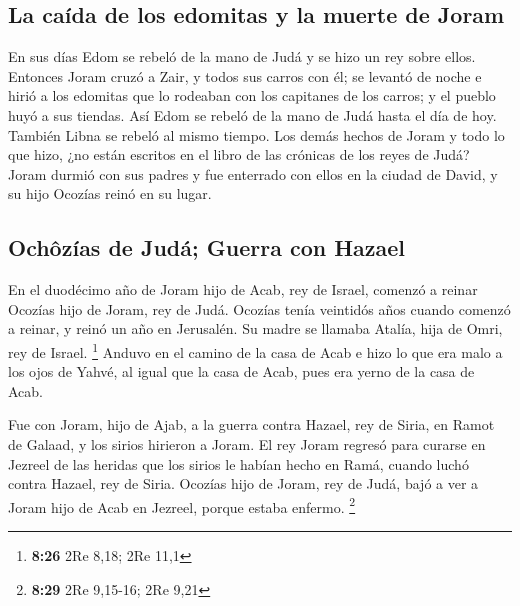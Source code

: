 \begin{paracol}{2}
\hypertarget{la-cauxedda-de-los-edomitas-y-la-muerte-de-joram}{%
\subsection{La caída de los edomitas y la muerte de
Joram}\label{la-cauxedda-de-los-edomitas-y-la-muerte-de-joram}}

 En sus días Edom se rebeló de la mano de Judá y se hizo
un rey sobre ellos.  Entonces Joram cruzó a Zair, y todos
sus carros con él; se levantó de noche e hirió a los edomitas que lo
rodeaban con los capitanes de los carros; y el pueblo huyó a sus
tiendas.  Así Edom se rebeló de la mano de Judá hasta el
día de hoy. También Libna se rebeló al mismo tiempo.  Los
demás hechos de Joram y todo lo que hizo, ¿no están escritos en el libro
de las crónicas de los reyes de Judá?  Joram durmió con
sus padres y fue enterrado con ellos en la ciudad de David, y su hijo
Ocozías reinó en su lugar.

\hypertarget{ochuxf4zuxedas-de-juduxe1-guerra-con-hazael}{%
\subsection{Ochôzías de Judá; Guerra con
Hazael}\label{ochuxf4zuxedas-de-juduxe1-guerra-con-hazael}}

 En el duodécimo año de Joram hijo de Acab, rey de
Israel, comenzó a reinar Ocozías hijo de Joram, rey de Judá.
 Ocozías tenía veintidós años cuando comenzó a reinar, y
reinó un año en Jerusalén. Su madre se llamaba Atalía, hija de Omri, rey
de Israel. \footnote{\textbf{8:26} 2Re 8,18; 2Re 11,1} 
Anduvo en el camino de la casa de Acab e hizo lo que era malo a los ojos
de Yahvé, al igual que la casa de Acab, pues era yerno de la casa de
Acab.

 Fue con Joram, hijo de Ajab, a la guerra contra Hazael,
rey de Siria, en Ramot de Galaad, y los sirios hirieron a Joram.
 El rey Joram regresó para curarse en Jezreel de las
heridas que los sirios le habían hecho en Ramá, cuando luchó contra
Hazael, rey de Siria. Ocozías hijo de Joram, rey de Judá, bajó a ver a
Joram hijo de Acab en Jezreel, porque estaba enfermo. \footnote{\textbf{8:29}
  2Re 9,15-16; 2Re 9,21}

\switchcolumn
\begin{otherlanguage}{english}

\hypertarget{section-15}{%
}
\end{otherlanguage}
\end{paracol}

